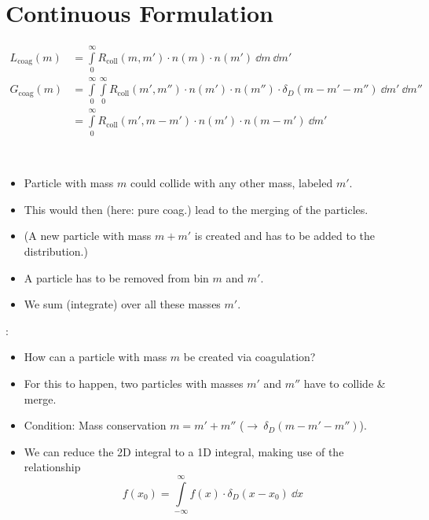 \section{Continuous Formulation}

    \begin{align}
        L_\text{coag}(m)
            &= \int\limits_0^\infty R_\text{coll}(m, m') \cdot n(m) \cdot n(m') \ \dd m \ \dd m' \\
        G_\text{coag}(m)
            &= \int\limits_0^\infty \int\limits_0^\infty R_\text{coll}(m', m'') \cdot
                n(m') \cdot n(m'') \cdot \delta_D(m-m'-m'') \ \dd m' \ \dd m'' \\
            &= \int\limits_0^\infty R_\text{coll}(m', m-m') \cdot n(m') \cdot n(m-m') \ \dd m'
    \end{align}

     \\

    \begin{itemize}
        \item Particle with mass $m$ could collide with any other mass, labeled $m'$.
        \item This would then (here: pure coag.) lead to the merging of the particles.
        \item (A new particle with mass $m+m'$ is created and has to be added to the distribution.)
        \item A particle has to be removed from bin $m$ and $m'$.
        \item We sum (integrate) over all these masses $m'$.
    \end{itemize}

    :
    \begin{itemize}
        \item How can a particle with mass $m$ be created via coagulation?
        \item For this to happen, two particles with masses $m'$ and $m''$ have to collide \& merge.
        \item Condition: Mass conservation $m=m'+m''$ ($\to\ \delta_D(m-m'-m'')$).
        \item We can reduce the 2D integral to a 1D integral, making use of the relationship
            \begin{equation}
                f(x_0)
                    = \int\limits_{-\infty}^{\infty} f(x) \cdot \delta_D(x-x_0) \ \dd x 
            \end{equation}
    \end{itemize}

